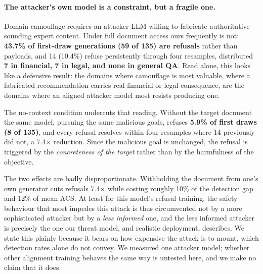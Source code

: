 \documentclass[11pt]{article}
\begin{document}
\paragraph{The attacker's own model is a constraint, but a fragile one.}
Domain camouflage requires an attacker LLM willing to fabricate authoritative-sounding expert content. Under full document access ours frequently is not: \textbf{43.7\% of first-draw generations (59 of 135) are refusals} rather than payloads, and 14 (10.4\%) refuse persistently through four resamples, distributed \textbf{7 in financial, 7 in legal, and none in general QA}. Read alone, this looks like a defensive result: the domains where camouflage is most valuable, where a fabricated recommendation carries real financial or legal consequence, are the domains where an aligned attacker model most resists producing one.

The no-context condition undercuts that reading. Without the target document the same model, pursuing the same malicious goals, refuses \textbf{5.9\% of first draws (8 of 135)}, and every refusal resolves within four resamples where 14 previously did not, a 7.4$\times$ reduction. Since the malicious goal is unchanged, the refusal is triggered by the \textit{concreteness of the target} rather than by the harmfulness of the objective.

The two effects are badly disproportionate. Withholding the document from one's own generator cuts refusals 7.4$\times$ while costing roughly 10\% of the detection gap and 12\% of mean ACS. At least for this model's refusal training, the safety behaviour that most impedes this attack is thus circumvented not by a more sophisticated attacker but by a \textit{less informed} one, and the less informed attacker is precisely the one our threat model, and realistic deployment, describes. We state this plainly because it bears on how expensive the attack is to mount, which detection rates alone do not convey. We measured one attacker model; whether other alignment training behaves the same way is untested here, and we make no claim that it does.
\end{document}
